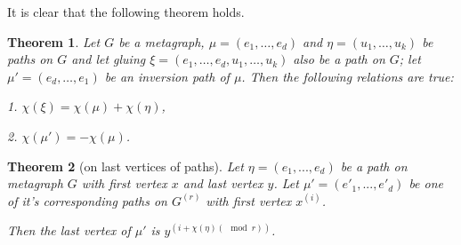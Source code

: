\documentclass[a4paper,fleqn]{cas-sc}
\newtheorem{theorem}{Theorem}
\begin{document}
It is clear that the following theorem holds.

\begin{theorem} \label{glued_paths}
    Let $G$ be a metagraph, $\mu = (e_1, \dots, e_d)$ and $\eta = (u_1, \dots, u_k)$ be paths on $G$ and let gluing $\xi = (e_1, \dots, e_d, u_1, \dots, u_k)$ also be a path on $G$; let $\mu' = (e_d, \dots, e_1)$ be an inversion path of $\mu$. Then the following relations are true:

    1. $ \chi(\xi) = \chi(\mu) + \chi(\eta)$,

    2. $ \chi(\mu') = -\chi(\mu)$.
\end{theorem}

\begin{theorem}[on last vertices of paths]\label{theorem_last_vertices}
    Let $\eta = (e_1, ..., e_d)$ be a path on metagraph $G$ with first vertex $x$ and last vertex $y$. Let $\mu' = (e'_1, ..., e'_d)$ be one of it's corresponding paths on $G^{(r)}$ with first vertex $x^{(i)}$.
    
    Then the last vertex of $\mu'$ is $y^{(i + \chi(\eta) (\mod{r}))}$.
    
\end{theorem}
    
\end{document}
